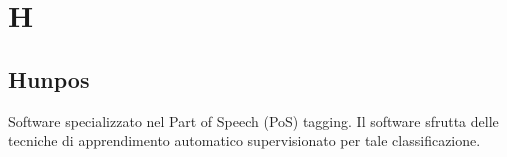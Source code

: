 \section*{H}
\subsection*{Hunpos}
Software specializzato nel Part of Speech (PoS) tagging\glo. Il software sfrutta delle tecniche di apprendimento automatico supervisionato per tale classificazione.  


